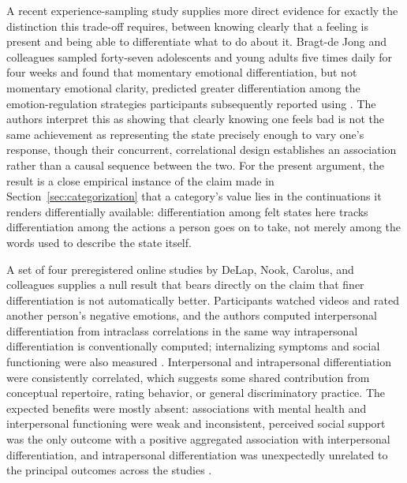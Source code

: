 \documentclass[11pt]{article}
\begin{document}
A recent experience-sampling study supplies more direct evidence for exactly the distinction this trade-off requires, between knowing clearly that a feeling is present and being able to differentiate what to do about it. Bragt-de Jong and colleagues sampled forty-seven adolescents and young adults five times daily for four weeks and found that momentary emotional differentiation, but not momentary emotional clarity, predicted greater differentiation among the emotion-regulation strategies participants subsequently reported using \citep{BragtdeJong2026}. The authors interpret this as showing that clearly knowing one feels bad is not the same achievement as representing the state precisely enough to vary one's response, though their concurrent, correlational design establishes an association rather than a causal sequence between the two. For the present argument, the result is a close empirical instance of the claim made in Section~\ref{sec:categorization} that a category's value lies in the continuations it renders differentially available: differentiation among felt states here tracks differentiation among the actions a person goes on to take, not merely among the words used to describe the state itself.

A set of four preregistered online studies by DeLap, Nook, Carolus, and colleagues supplies a null result that bears directly on the claim that finer differentiation is not automatically better. Participants watched videos and rated another person's negative emotions, and the authors computed interpersonal differentiation from intraclass correlations in the same way intrapersonal differentiation is conventionally computed; internalizing symptoms and social functioning were also measured \citep{DeLap2026}. Interpersonal and intrapersonal differentiation were consistently correlated, which suggests some shared contribution from conceptual repertoire, rating behavior, or general discriminatory practice. The expected benefits were mostly absent: associations with mental health and interpersonal functioning were weak and inconsistent, perceived social support was the only outcome with a positive aggregated association with interpersonal differentiation, and intrapersonal differentiation was unexpectedly unrelated to the principal outcomes across the studies \citep{DeLap2026}.
\end{document}
